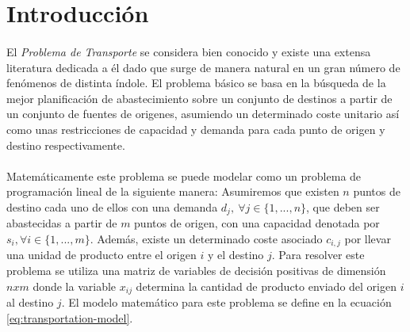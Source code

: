 \documentclass[a4paper, spanish]{article}
\begin{document}
  \maketitle

  \begin{abstract}
    \noindent [TODO]
  \end{abstract}


  \section{Introducción}
  \label{sec:introduction}

    \paragraph{}
    El \emph{Problema de Transporte} se considera bien conocido y existe una extensa literatura dedicada a él dado que surge de manera natural en un gran número de fenómenos de distinta índole. El problema básico se basa en la búsqueda de la mejor planificación de abastecimiento sobre un conjunto de destinos a partir de un conjunto de fuentes de origenes, asumiendo un determinado coste unitario así como unas restricciones de capacidad y demanda para cada punto de origen y destino respectivamente.

    \paragraph{}
    Matemáticamente este problema se puede modelar como un problema de programación lineal de la siguiente manera: Asumiremos que existen $n$ puntos de destino cada uno de ellos con una demanda $d_j, \ \forall j \in \{1,...,n\}$, que deben ser abastecidas a partir de $m$ puntos de origen, con una capacidad denotada por $s_{i}, \forall i \in \{1, ..., m\}$. Además, existe un determinado coste asociado $c_{i, j}$ por llevar una unidad de producto entre el origen $i$ y el destino $j$. Para resolver este problema se utiliza una matriz de variables de decisión positivas de dimensión $nxm$ donde la variable $x_{ij}$ determina la cantidad de producto enviado del origen $i$ al destino $j$. El modelo matemático para este problema se define en la ecuación \eqref{eq:transportation-model}.
\end{document}
